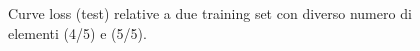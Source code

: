 \documentclass[a4paper,12pt]{article}
\begin{document}
\begin{figure}[htp]
    \centering

    \medskip


    \caption{Curve loss (test) relative a due training set con diverso numero di elementi (4/5) e (5/5).}
    \label{fig:c3-3}
\end{figure}
\end{document}
